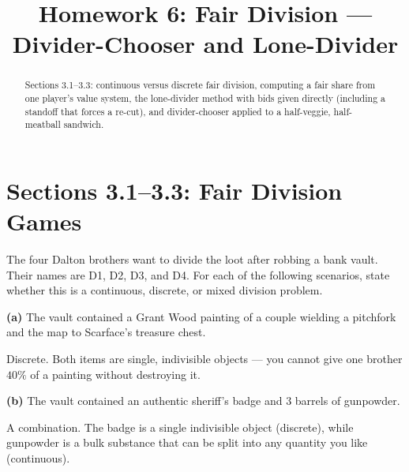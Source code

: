 \documentclass[12pt]{ximera}
\title{Homework 6: Fair Division --- Divider-Chooser and Lone-Divider}
\begin{document}
\begin{abstract}
Sections 3.1--3.3: continuous versus discrete fair division, computing a fair share
from one player's value system, the lone-divider method with bids given directly (including a
standoff that forces a re-cut), and divider-chooser applied to a half-veggie, half-meatball
sandwich.
\end{abstract}
\maketitle

\section*{Sections 3.1--3.3: Fair Division Games}

\begin{problem}
The four Dalton brothers want to divide the loot after robbing a bank vault. Their
names are D1, D2, D3, and D4. For each of the following scenarios, state whether this is
a continuous, discrete, or mixed division problem.

\begin{prompt}
\textbf{(a)} The vault contained a Grant Wood painting of a couple wielding a pitchfork
and the map to Scarface's treasure chest.

\begin{multipleChoice}
\end{multipleChoice}

\begin{feedback}
Discrete. Both items are single, indivisible objects --- you cannot give one brother
$40\%$ of a painting without destroying it.
\end{feedback}
\end{prompt}

\begin{prompt}
\textbf{(b)} The vault contained an authentic sheriff's badge and $3$ barrels of
gunpowder.

\begin{multipleChoice}
\end{multipleChoice}

\begin{feedback}
A combination. The badge is a single indivisible object (discrete), while gunpowder
is a bulk substance that can be split into any quantity you like (continuous).
\end{feedback}
\end{prompt}


\end{problem}
\end{document}
